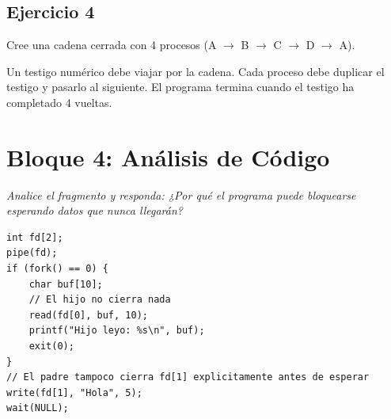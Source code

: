 \documentclass[12pt,a4paper]{article}
\begin{document}
\subsection*{Ejercicio 4}
Cree una cadena cerrada con 4 procesos (A $\rightarrow$ B $\rightarrow$ C $\rightarrow$ D $\rightarrow$ A).
\begin{center}
\end{center}
Un testigo numérico debe viajar por la cadena. Cada proceso debe duplicar el testigo y pasarlo al siguiente. El programa termina cuando el testigo ha completado 4 vueltas.

\section*{Bloque 4: Análisis de Código}
\textit{Analice el fragmento y responda: ¿Por qué el programa puede bloquearse esperando datos que nunca llegarán?}

\begin{lstlisting}
int fd[2];
pipe(fd);
if (fork() == 0) {
    char buf[10];
    // El hijo no cierra nada
    read(fd[0], buf, 10);
    printf("Hijo leyo: %s\n", buf);
    exit(0);
}
// El padre tampoco cierra fd[1] explicitamente antes de esperar
write(fd[1], "Hola", 5);
wait(NULL);
\end{lstlisting}
\end{document}
